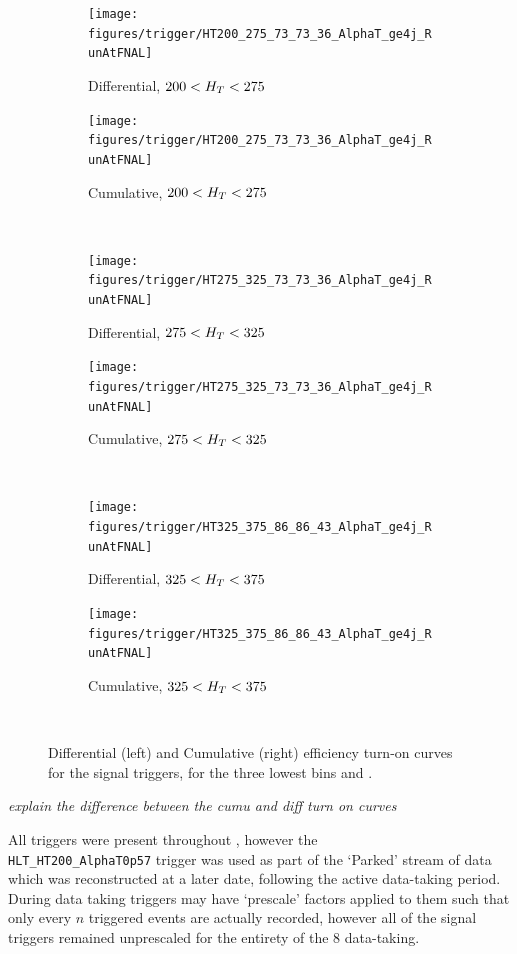 \begin{figure}[!ht]
  \centering
    
    \begin{subfigure}[b]{0.48\textwidth}
      \texttt{[image: figures/trigger/HT200\_275\_73\_73\_36\_AlphaT\_ge4j\_RunAtFNAL]}
      \caption{Differential, $200 < H_T < 275 $ \gev}
    \end{subfigure}
    \begin{subfigure}[b]{0.48\textwidth}
      \texttt{[image: figures/trigger/HT200\_275\_73\_73\_36\_AlphaT\_ge4j\_RunAtFNAL]}
      \caption{Cumulative, $200 < H_T < 275 $ \gev}
    \end{subfigure} \\
    \begin{subfigure}[b]{0.48\textwidth}
      \texttt{[image: figures/trigger/HT275\_325\_73\_73\_36\_AlphaT\_ge4j\_RunAtFNAL]}
      \caption{Differential, $275 < H_T < 325 $ \gev}
    \end{subfigure}
    \begin{subfigure}[b]{0.48\textwidth}
      \texttt{[image: figures/trigger/HT275\_325\_73\_73\_36\_AlphaT\_ge4j\_RunAtFNAL]}
      \caption{Cumulative, $275 < H_T < 325 $ \gev}
    \end{subfigure} \\
    \begin{subfigure}[b]{0.48\textwidth}
      \texttt{[image: figures/trigger/HT325\_375\_86\_86\_43\_AlphaT\_ge4j\_RunAtFNAL]}
      \caption{Differential, $325 < H_T < 375 $ \gev}
    \end{subfigure}
    \begin{subfigure}[b]{0.48\textwidth}
      \texttt{[image: figures/trigger/HT325\_375\_86\_86\_43\_AlphaT\_ge4j\_RunAtFNAL]}
      \caption{Cumulative, $325 < H_T < 375 $ \gev}
    \end{subfigure} \\
  
    \caption{\label{fig:eff_alphat_ge4j}
      Differential (left) and Cumulative (right) efficiency turn-on curves for 
      the signal triggers, for the three lowest \HT bins and \njhigh.}
\end{figure}

\emph{explain the difference between the cumu and diff turn on curves}

All triggers were present throughout \runone, however the 
\\\verb!HLT_HT200_AlphaT0p57! trigger was used as part of the `Parked' stream of 
data which was reconstructed at a later date, following the active data-taking 
period. During data taking triggers may have `prescale' factors applied to them 
such that only every $n$ triggered events are actually recorded, however all of
the signal triggers remained unprescaled for the entirety of the 8 \tev
data-taking.


